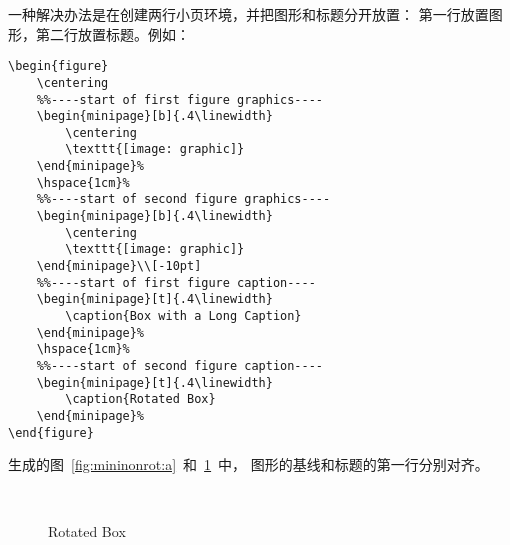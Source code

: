 一种解决办法是在创建两行小页环境，并把图形和标题分开放置：
第一行放置图形，第二行放置标题。例如：
\begin{lstlisting}
\begin{figure}
	\centering
	%%----start of first figure graphics----
	\begin{minipage}[b]{.4\linewidth}
		\centering
		\texttt{[image: graphic]}
	\end{minipage}%
	\hspace{1cm}%
	%%----start of second figure graphics----
	\begin{minipage}[b]{.4\linewidth}
		\centering
		\texttt{[image: graphic]}
	\end{minipage}\\[-10pt]
	%%----start of first figure caption----
	\begin{minipage}[t]{.4\linewidth}
		\caption{Box with a Long Caption}
	\end{minipage}%
	\hspace{1cm}%
	%%----start of second figure caption----
	\begin{minipage}[t]{.4\linewidth}
		\caption{Rotated Box}
	\end{minipage}%
\end{figure}
\end{lstlisting}
生成的图~\ref{fig:mininonrot:a}~和~\ref{fig:minirot:a}~中，
图形的基线和标题的第一行分别对齐。

\begin{figure}
	\centering
	\begin{minipage}[b]{.4\linewidth}
		\centering
		\resizebox{2cm}{!}{\usebox{\boxgraphic}}
	\end{minipage}%
	\hspace{1cm}%
	\begin{minipage}[b]{.4\linewidth}
		\centering
	\end{minipage}\\[-10pt]
	\begin{minipage}[t]{.4\linewidth}
		\caption{Box with a Long Caption}\label{fig:mininonrot:a}
	\end{minipage}%
	\hspace{1cm}%
	\begin{minipage}[t]{.4\linewidth}
		\caption{Rotated Box}\label{fig:minirot:a}
	\end{minipage}%
\end{figure}


